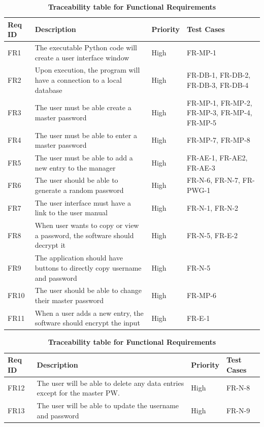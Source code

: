 \documentclass[12pt, titlepage]{article}
\begin{document}
\begin{table}[!htbp]
    \caption{\textbf{Traceability table for Functional Requirements}} \label{Table}
    \begin{tabularx}{\textwidth}{p{2cm}Xp{2cm}X}
        \toprule
        \textbf{Req ID} & \textbf{Description} & \textbf{Priority} & \textbf{Test Cases}\\
        \midrule
        FR1  & The executable Python code will create a user interface window & High & FR-MP-1\\\hline
        FR2  & Upon execution, the program will have a connection to a local database & High & FR-DB-1, FR-DB-2, FR-DB-3, FR-DB-4\\\hline
        FR3  & The user must be able create a master password & High & FR-MP-1, FR-MP-2, FR-MP-3, FR-MP-4, FR-MP-5\\\hline
        FR4  & The user must be able to enter a master password & High & FR-MP-7, FR-MP-8\\\hline
        FR5  & The user must be able to add a new entry to the manager & High & FR-AE-1, FR-AE2, FR-AE-3\\\hline
        FR6  & The user should be able to generate a random password  & High & FR-N-6, FR-N-7, FR-PWG-1\\\hline
        FR7  & The user interface must have a link to the user manual & High & FR-N-1, FR-N-2\\\hline
        FR8  & When user wants to copy or view a password, the software should decrypt it & High & FR-N-5, FR-E-2\\\hline
        FR9  & The application should have buttons to directly copy username and password & High & FR-N-5\\\hline
        FR10 & The user should be able to change their master password  & High & FR-MP-6\\\hline
        FR11 & When a user adds a new entry, the software should encrypt the input & High & FR-E-1\\
    
        \bottomrule
    \end{tabularx}
\end{table}

\begin{table}[!htbp]
    \caption{\textbf{Traceability table for Functional Requirements}} \label{5Table}
    \begin{tabularx}{\textwidth}{p{2cm}Xp{2cm}X}
        \toprule
        \textbf{Req ID} & \textbf{Description} & \textbf{Priority} & \textbf{Test Cases}\\
        \midrule
        FR12 & The user will be able to delete any data entries except for the master PW. & High & FR-N-8\\\hline
        FR13 & The user will be able to update the username and password & High & FR-N-9\\
    
        \bottomrule
    \end{tabularx}
\end{table}
\end{document}
